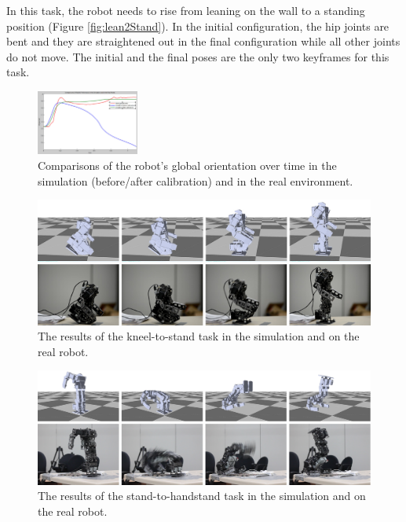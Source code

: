 In this task, the robot needs to rise from leaning on the wall to a standing position (Figure \ref{fig:lean2Stand}). In the initial configuration, the hip joints are bent and they are straightened out in the final configuration while all other joints do not move. The initial and the final poses are the only two keyframes for this task.

\begin{figure}[!b]
  \centering
  \includegraphics[width=0.3\textwidth]{figures/simRobotCompare}
  \caption{Comparisons of the robot's global orientation over time in the simulation (before/after calibration) and in the real environment.}
  \vspace{-0.1in}
  \label{fig:simRobotCompare}
\end{figure}


\begin{figure}[!t]
  \centering
  \includegraphics[width=\textwidth]{figures/kneel2Stand}
  \caption{The results of the kneel-to-stand task in the simulation and on the real robot.}
  \vspace{-0.1in}
  \label{fig:kneel2Stand}
\end{figure}

\begin{figure}[!t]
  \centering
  \includegraphics[width=\textwidth]{figures/stand2Hand}
  \caption{The results of the stand-to-handstand task in the simulation and on the real robot.}
  \vspace{-0.1in}
  \label{fig:stand2Hand}
\end{figure}

